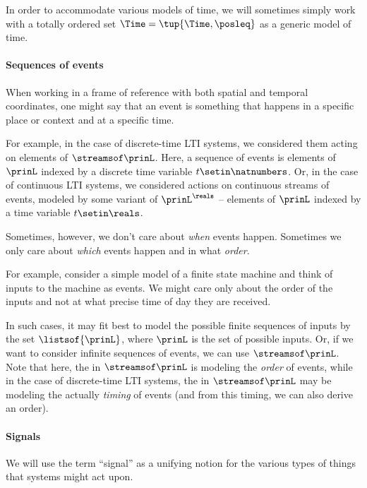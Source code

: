 In order to accommodate various models of time, we will sometimes simply work with a totally ordered set $\Time = \tup{\Time, \posleq}$ as a generic model of time.

\paragraph{Sequences of events}

When working in a frame of reference with both spatial and temporal coordinates, one might say that an event is something that happens in a specific place or context and at a specific time.

For example, in the case of discrete-time LTI systems, we considered them acting on elements of $\streamsof\prinL$.
Here, a sequence of events is elements of $\prinL$ indexed by a discrete time variable $t \setin \natnumbers$.
Or, in the case of continuous LTI systems, we considered actions on continuous streams of events, modeled by some variant of $\prinL^{\reals}$ -- elements of $\prinL$ indexed by a time variable $t \setin \reals$.

Sometimes, however, we don't care about \emph{when} events happen.
Sometimes we only care about \emph{which} events happen and in what \emph{order}.

For example, consider a simple model of a finite state machine and think of inputs to the machine as events.
We might care only about the order of the inputs and not at what precise time of day they are received.

In such cases, it may fit best to model the possible finite sequences of inputs by the set $\listsof{\prinL}$, where $\prinL$ is the set of possible inputs.
Or, if we want to consider infinite sequences of events, we can use $\streamsof\prinL$.
Note that here, the \natnumbers in $\streamsof\prinL$ is modeling the \emph{order} of events, while in the case of discrete-time LTI systems, the \natnumbers in $\streamsof\prinL$ may be modeling the actually \emph{timing} of events (and from this timing, we can also derive an order).

\paragraph{Signals}

We will use the term ``signal'' as a unifying notion for the various types of things that systems might act upon.

